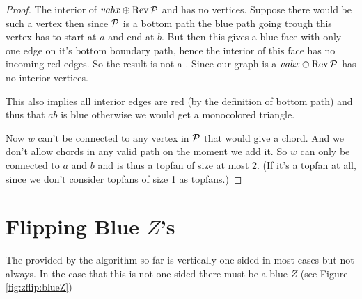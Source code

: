 \begin{proof}
      The interior of  $vabx \oplus \rev \P$ and has no vertices. Suppose there would be such a vertex then since $\P$ is a bottom path the blue path going trough this vertex has to start at $a$ and end at $b$. But then this gives a blue face with only one edge on it's bottom boundary path, hence the interior of this face has no incoming red edges.  So the result is not a \rel. Since our graph is a \rel $vabx \oplus \rev \P$ has no interior vertices.

      This also implies all interior edges are red (by the definition of bottom path) and thus that $ab$ is blue otherwise we would get a monocolored triangle.

      Now $w$ can't be connected to any vertex in $\P$ that would give a chord. And we don't allow chords in any valid path on the moment we add it. So $w$ can only be connected to $a$ and $b$ and is thus a topfan of size at most $2$. (If it's a topfan at all, since we don't consider topfans of size 1 as topfans.)
    \end{proof}

\newpage
\section{Flipping Blue $Z$'s}
    The \rel provided by the algorithm so far is vertically one-sided in most cases but not always. In the case that this \rel is not one-sided there must be a blue $Z$ (see Figure \ref{fig:zflip:blueZ})

